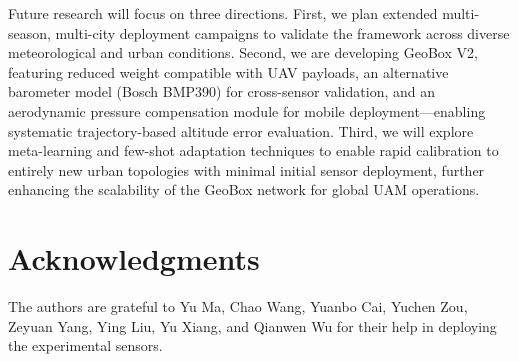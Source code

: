 \documentclass[lettersize,journal]{IEEEtran}
\begin{document}
Future research will focus on three directions. First, we plan extended multi-season, multi-city deployment campaigns to validate the framework across diverse meteorological and urban conditions. Second, we are developing GeoBox V2, featuring reduced weight compatible with UAV payloads, an alternative barometer model (Bosch BMP390) for cross-sensor validation, and an aerodynamic pressure compensation module for mobile deployment---enabling systematic trajectory-based altitude error evaluation. Third, we will explore meta-learning and few-shot adaptation techniques to enable rapid calibration to entirely new urban topologies with minimal initial sensor deployment, further enhancing the scalability of the GeoBox network for global UAM operations.

\section*{Acknowledgments}
The authors are grateful to Yu Ma, Chao Wang, Yuanbo Cai, Yuchen Zou, Zeyuan Yang, Ying Liu, Yu Xiang, and Qianwen Wu for their help in deploying the experimental sensors. 





\newpage
 



\vfill
\end{document}
